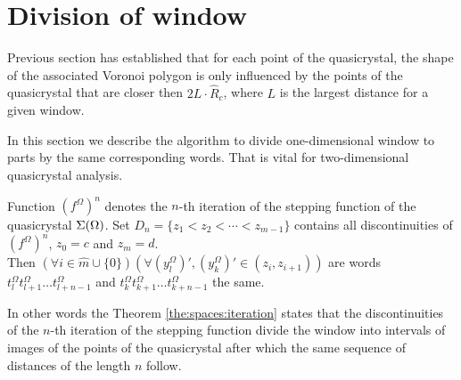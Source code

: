 \documentclass[text.tex]{subfiles}
\begin{document}
\section{Division of window}%
Previous section has established that for each point of the quasicrystal, the shape of the associated Voronoi polygon is only influenced by the points of the quasicrystal that are closer then $2L\cdot\hat{R}_c$, where $L$ is the largest distance for a given window. 

In this section we describe the algorithm to divide one-dimensional window to parts by the same corresponding words. That is vital for two-dimensional quasicrystal analysis.

\begin{theorem}
\label{the:spaces:iteration}
Function ${(f^\Omega)}^n$ denotes the $n$-th iteration of the stepping function of the quasicrystal $\Sigma(\Omega)$. Set $D_n = \{z_1 < z_2 < \dotsb < z_{m-1}\}$ contains all discontinuities of ${(f^\Omega)}^n$, $z_0 = c$ and $z_m = d$.\\
Then $(\forall i \in \widehat{m}\cup\{0\})(\forall {\left(y_l^\Omega\right)}' ,{\left(y_k^\Omega\right)}' \in (z_i, z_{i+1}))$ are words $t_l^\Omega t_{l+1}^\Omega \dotso t_{l+n-1}^\Omega$ and $t_k^\Omega t_{k+1}^\Omega \dotso t_{k+n-1}^\Omega$ the same.
\end{theorem}

\begin{remark}
In other words the Theorem \ref{the:spaces:iteration} states that the discontinuities of the $n$-th iteration of the stepping function divide the window into intervals of images of the points of the quasicrystal after which the same sequence of distances of the length $n$ follow.
\end{remark}
\end{document}
